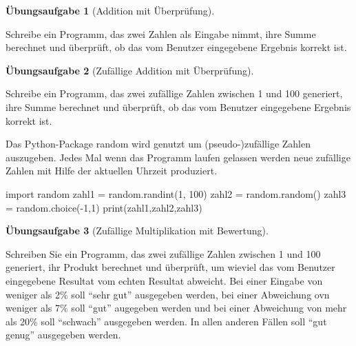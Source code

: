 \documentclass[
  10pt,
  a4paper,
  DIV=11]{scrartcl}
\newenvironment{Shaded}{\begin{snugshade}}{\end{snugshade}}
\newcommand{\BuiltInTok}[1]{\textcolor[rgb]{0.00,0.23,0.31}{#1}}
\newcommand{\DecValTok}[1]{\textcolor[rgb]{0.68,0.00,0.00}{#1}}
\newcommand{\ImportTok}[1]{\textcolor[rgb]{0.00,0.46,0.62}{#1}}
\newcommand{\NormalTok}[1]{\textcolor[rgb]{0.00,0.23,0.31}{#1}}
\newcommand{\OperatorTok}[1]{\textcolor[rgb]{0.37,0.37,0.37}{#1}}
\theoremstyle{definition}
\newtheorem{exercise}{Übungsaufgabe}[section]
\theoremstyle{remark}
\begin{document}
\begin{exercise}[Addition mit
Überprüfung]\protect\hypertarget{exr-line}{}\label{exr-line}

Schreibe ein Programm, das zwei Zahlen als Eingabe nimmt, ihre Summe
berechnet und überprüft, ob das vom Benutzer eingegebene Ergebnis
korrekt ist.

\end{exercise}

\begin{exercise}[Zufällige Addition mit
Überprüfung]\protect\hypertarget{exr-line}{}\label{exr-line}

Schreibe ein Programm, das zwei zufällige Zahlen zwischen 1 und 100
generiert, ihre Summe berechnet und überprüft, ob das vom Benutzer
eingegebene Ergebnis korrekt ist.

\begin{tcolorbox}[enhanced jigsaw, colback=white, opacitybacktitle=0.6, left=2mm, breakable, rightrule=.15mm, leftrule=.75mm, title=\textcolor{quarto-callout-tip-color}{\faLightbulb}\hspace{0.5em}{Random-Package}, coltitle=black, toptitle=1mm, colbacktitle=quarto-callout-tip-color!10!white, titlerule=0mm, bottomrule=.15mm, bottomtitle=1mm, colframe=quarto-callout-tip-color-frame, toprule=.15mm, opacityback=0, arc=.35mm]

Das Python-Package random wird genutzt um (pseudo-)zufällige Zahlen
auszugeben. Jedes Mal wenn das Programm laufen gelassen werden neue
zufällige Zahlen mit Hilfe der aktuellen Uhrzeit produziert.

\begin{Shaded}
\begin{Highlighting}[]
\ImportTok{import}\NormalTok{ random}
\NormalTok{zahl1 }\OperatorTok{=}\NormalTok{ random.randint(}\DecValTok{1}\NormalTok{, }\DecValTok{100}\NormalTok{)}
\NormalTok{zahl2 }\OperatorTok{=}\NormalTok{ random.random()}
\NormalTok{zahl3 }\OperatorTok{=}\NormalTok{ random.choice(}\OperatorTok{{-}}\DecValTok{1}\NormalTok{,}\DecValTok{1}\NormalTok{)}
\BuiltInTok{print}\NormalTok{(zahl1,zahl2,zahl3)}
\end{Highlighting}
\end{Shaded}

\end{tcolorbox}

\end{exercise}

\begin{exercise}[Zufällige Multiplikation mit
Bewertung]\protect\hypertarget{exr-line}{}\label{exr-line}

Schreiben Sie ein Programm, das zwei zufällige Zahlen zwischen 1 und 100
generiert, ihr Produkt berechnet und überprüft, um wieviel das vom
Benutzer eingegebene Resultat vom echten Resultat abweicht. Bei einer
Eingabe von weniger als 2\% soll ``sehr gut'' ausgegeben werden, bei
einer Abweichung ovn weniger als 7\% soll ``gut'' augegeben werden und
bei einer Abweichung von mehr als 20\% soll ``schwach'' ausgegeben
werden. In allen anderen Fällen soll ``gut genug'' ausgegeben werden.

\end{exercise}
\end{document}

